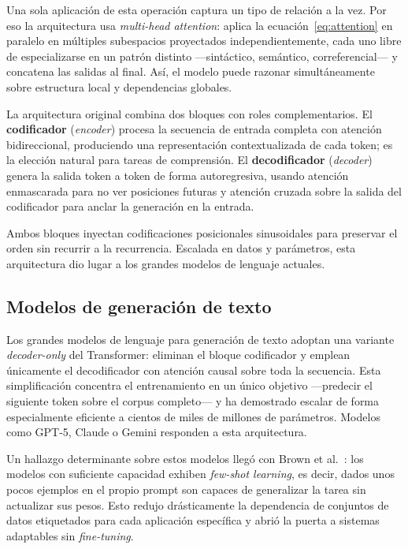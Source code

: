 Una sola aplicación de esta operación captura un tipo de relación a la vez. Por eso la
arquitectura usa \textit{multi-head attention}: aplica la ecuación~\eqref{eq:attention}
en paralelo en múltiples subespacios proyectados independientemente, cada uno libre de especializarse
en un patrón distinto —sintáctico, semántico, correferencial— y concatena las salidas al final.
Así, el modelo puede razonar simultáneamente sobre estructura local y dependencias globales.

La arquitectura original combina dos bloques con roles complementarios. El \textbf{codificador}
(\textit{encoder}) procesa la secuencia de entrada completa con atención bidireccional,
produciendo una representación contextualizada de cada token; es la elección natural para tareas
de comprensión. El \textbf{decodificador} (\textit{decoder}) genera la salida token a token de
forma autoregresiva, usando atención enmascarada para no ver posiciones futuras y atención cruzada
sobre la salida del codificador para anclar la generación en la entrada.

Ambos bloques inyectan codificaciones posicionales sinusoidales para preservar el orden sin recurrir
a la recurrencia. Escalada en datos y parámetros, esta arquitectura dio lugar a los grandes modelos
de lenguaje actuales.

\subsection{Modelos de generación de texto}

Los grandes modelos de lenguaje para generación de texto adoptan una variante \textit{decoder-only}
del Transformer: eliminan el bloque codificador y emplean únicamente el decodificador con atención
causal sobre toda la secuencia. Esta simplificación concentra el entrenamiento en un único objetivo
—predecir el siguiente token sobre el corpus completo— y ha demostrado escalar de forma
especialmente eficiente a cientos de miles de millones de parámetros. Modelos como GPT-5, Claude
o Gemini responden a esta arquitectura.

Un hallazgo determinante sobre estos modelos llegó con Brown et al.~\cite{brown2020gpt3}: los modelos
con suficiente capacidad exhiben \textit{few-shot learning}, es decir, dados unos pocos ejemplos en
el propio prompt son capaces de generalizar la tarea sin actualizar sus pesos. Esto redujo drásticamente
la dependencia de conjuntos de datos etiquetados para cada aplicación específica y abrió la puerta a
sistemas adaptables sin \textit{fine-tuning}.

